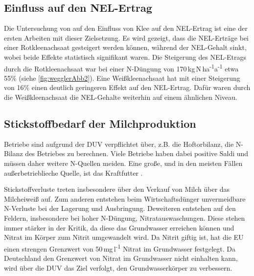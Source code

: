 \subsection{Einfluss auf den \acl{NEL}-Ertrag}
\label{subsec:NEL}
Die Untersuchung von \textcite{weggler2050leguminosen} auf den Einfluss von Klee auf den \ac{NEL}-Ertrag ist eine der ersten Arbeiten mit dieser Zielsetzung.
Es wird gezeigt, dass die \ac{NEL}-Erträge bei einer Rotkleenachsaat gesteigert werden können, während der \ac{NEL}-Gehalt sinkt, wobei beide Effekte statistisch signifikant waren.
Die Steigerung des \ac{NEL}-Etrags durch die Rotkleenachsaat war bei einer N-Düngung von 170\,kg\,N\,ha\textsuperscript{-1}a\textsuperscript{-1} etwa 55\% (siehe \cref{fig:wegglerAbb2}).
Eine Weißkleenachsaat hat mit einer Steigerung von 16\% einen deutlich geringeren Effekt auf den \ac{NEL}-Ertrag.
Dafür waren durch die Weißkleenachsaat die \ac{NEL}-Gehalte weiterhin auf einem ähnlichen Niveau.


\subsection{Stickstoffbedarf der Milchproduktion}
\label{subsec:Stickstoff}
Betriebe sind aufgrund der \ac{DUV} verpflichtet über, z.B. die Hoftorbilanz, die N-Bilanz des Betriebes zu berechnen.
Viele Betriebe haben dabei positive Saldi \parencite[7ff.]{lellmann2005untersuchungen} und müssen daher weitere N-Quellen meiden.
Eine große, und in den meisten Fällen außerbetrieblieche Quelle, ist das Kraftfutter \parencite[62]{lellmann2005untersuchungen}.

Stickstoffverluste treten insbesondere über den Verkauf von Milch über das Milcheiweiß auf. 
Zum anderen entstehen beim Wirtschaftsdünger unvermeidbare N-Verluste bei der Lagerung und Ausbringung.
Deweiteren entstehen auf den Feldern, insbesondere bei hoher N-Düngung, Nitratauswaschungen.
Diese stehen immer stärker in der Kritik, da diese das Grundwasser erreichen können und Nitrat im Körper zum Nitrit umgewandelt wird.
Da Nitrit giftig ist, hat die \ac{EU} einen strengen Grenzwert von 50\,mg\,l\textsuperscript{-1} Nitrat im Grundwasser festgelegt.
Da Deutschland den Grenzwert von Nitrat im Grundwasser nicht einhalten kann, wird über die \ac{DUV} das Ziel verfolgt, den Grundwasserkörper zu verbessern.


